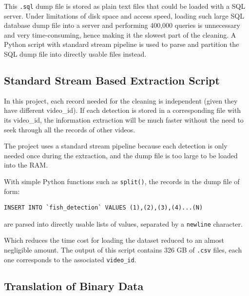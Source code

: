 \documentclass[bsc,logo,twoside,fullspacing,parskip]{infthesis}
\begin{document}
This {\tt .sql} dump file is stored as plain text files that could be loaded with a SQL server.
Under limitations of disk space and access speed, loading such large SQL database dump file into a server and performing 400,000 queries is unnecessary and very time-consuming, hence making it the slowest part of the cleaning. 
A Python script with standard stream pipeline is used to parse and partition the SQL dump file into directly usable files instead.

\subsection{Standard Stream Based Extraction Script}

In this project, each record needed for the cleaning is independent (given they have different video\_id). 
If each detection is stored in a corresponding file with its video\_id, the information extraction will be much faster without the need to seek through all the records of other videos.

The project uses a standard stream pipeline because each detection is only needed once during the extraction, and the dump file is too large to be loaded into the RAM.

With simple Python functions such as {\tt split()}, the records in the dump file of form:
\lstset{basicstyle=\small\ttfamily,breaklines=true,style=sql}
\begin{lstlisting}[frame=single]
 INSERT INTO `fish_detection` VALUES (1),(2),(3),(4)...(N)
\end{lstlisting}
are parsed into directly usable lists of values, separated by a {\tt newline} character.

Which reduces the time cost for loading the dataset reduced to an almost negligible amount. 
The output of this script contains 326 GB of {\tt .csv} files, each one corresponds to the associated {\tt video\_id}.


\subsection{Translation of Binary Data} 
\end{document}

